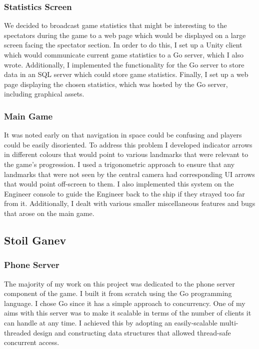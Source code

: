 \documentclass[a4paper,11pt]{article}
\begin{document}
\subsubsection{Statistics Screen}

We decided to broadcast game statistics that might be interesting to the spectators during the game to a web page which would be displayed on a large screen facing the spectator section. In order to do this, I set up a Unity client which would communicate current game statistics to a Go server, which I also wrote. Additionally, I implemented the functionality for the Go server to store data in an SQL server which could store game statistics. Finally, I set up a web page displaying the chosen statistics, which was hosted by the Go server, including graphical assets.

\subsubsection{Main Game}

It was noted early on that navigation in space could be confusing and players could be easily disoriented. To address this problem I developed indicator arrows in different colours that would point to various landmarks that were relevant to the game’s progression. I used a trigonometric approach to ensure that any landmarks that were not seen by the central camera had corresponding UI arrows that would point off-screen to them. I also implemented this system on the Engineer console to guide the Engineer back to the ship if they strayed too far from it. Additionally, I dealt with various smaller miscellaneous features and bugs that arose on the main game.

\clearpage

\subsection{Stoil Ganev}

\subsubsection{Phone Server}

The majority of my work on this project was dedicated to the phone server component of the game. I built it from scratch using the Go programming language. I chose Go since it has a simple approach to concurrency. One of my aims with this server was to make it scalable in terms of the number of clients it can handle at any time. I achieved this by adopting an easily-scalable multi-threaded design and constructing data structures that allowed thread-safe concurrent access.
\end{document}
